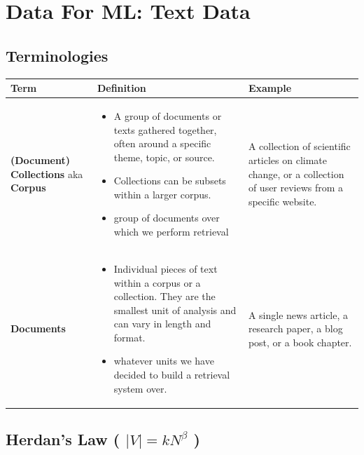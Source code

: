 \chapter{Data For ML: Text Data}

\section{Terminologies \cite{nlp-1, chatgpt, ir-1}}
\begin{table}[h!]
    \centering
    \begin{tabular}{| m{2cm} | m{6cm} | m{6cm} |}
        \hline
        \textbf{Term} & \textbf{Definition} & \textbf{Example} \\
        \hline
        \textbf{(Document) Collections} aka \textbf{Corpus} & \vspace{0.2cm}\begin{itemize}
            \item A group of documents or texts gathered together, often around a specific theme, topic, or source. 
            
            \item Collections can be subsets within a larger corpus.

            \item group of documents over which we perform retrieval \cite{ir-1}
        \end{itemize} & A collection of scientific articles on climate change, or a collection of user reviews from a specific website. \\
        \hline
        
        \textbf{Documents} & \vspace{0.3cm}\begin{itemize}
            \item Individual pieces of text within a corpus or a collection. They are the smallest unit of analysis and can vary in length and format.
            
            \item whatever units we have decided to build a retrieval system over. \cite{ir-1}
        \end{itemize} & A single news article, a research paper, a blog post, or a book chapter. \\
        \hline
        
    \end{tabular}
\end{table}

\section{Herdan’s Law ( $|V| = kN^{\beta}$ ) \cite{nlp-1}} \label{Herdan’s Law}

